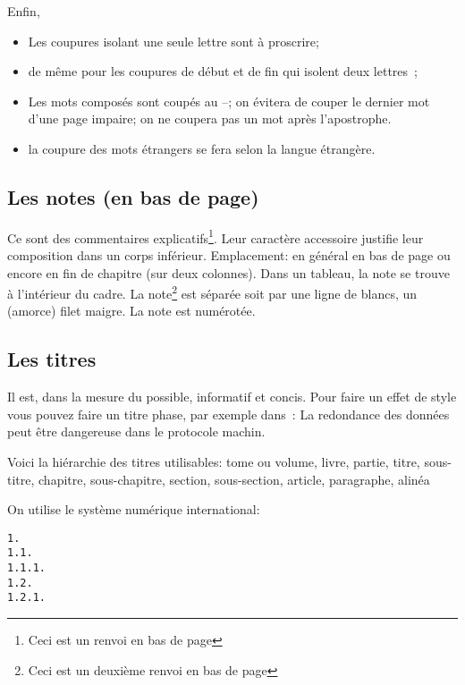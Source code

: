 \documentclass[twoside]{article}
\begin{document}
Enfin,

\begin{itemize}

\item Les coupures isolant une seule lettre sont \`a proscrire;

\item de m\^eme pour les coupures de d\'ebut et de fin qui isolent deux
lettres~;

\item Les mots compos\'es sont coup\'es au --; on \'evitera de couper
le dernier mot d'une page impaire; on ne coupera pas un mot apr\`es
l'apostrophe.

\item la coupure des mots \'etrangers se fera selon la langue
\'etrang\`ere.

\end{itemize}

\subsection{Les notes (en bas de page)} 

Ce sont des commentaires explicatifs\footnote{Ceci est un renvoi en
bas de page}. Leur caract\`ere accessoire justifie leur composition
dans un corps inf\'erieur.  Emplacement: en g\'en\'eral en bas de
page ou encore en fin de chapitre (sur deux colonnes). Dans un
tableau, la note se trouve \`a l'int\'erieur du cadre. La
note\footnote{Ceci est un deuxième renvoi en bas de page} est
s\'epar\'ee soit par une ligne de blancs, un (amorce) filet maigre. La
note est num\'erot\'ee.

\subsection{Les titres} 

Il est, dans la mesure du possible, informatif et concis. Pour faire
un effet de style vous pouvez faire un titre phase, par exemple dans~:
La redondance des données peut \^etre dangereuse dans le protocole
machin.

Voici la hi\'erarchie des titres utilisables: tome ou volume, livre,
partie, titre, sous-titre, chapitre, sous-chapitre, section,
sous-section, article, paragraphe, alin\'ea

On utilise le syst\`eme num\'erique international:
\begin{verbatim}
1.
1.1.
1.1.1.
1.2.
1.2.1.
\end{verbatim}
\end{document}
